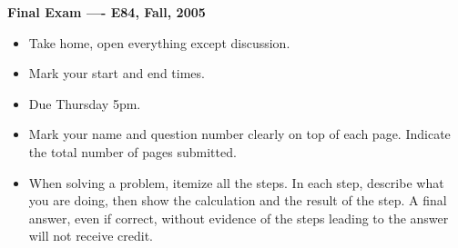 \usepackage{html}

\begin{center}
{\Large \bf  Final Exam ---- E84, Fall, 2005}
\end{center}

\begin{itemize}
\item Take home, open everything except discussion.
\item Mark your start and end times. %
\item Due Thursday 5pm.
\item Mark your name and question number clearly on top of each page.
	Indicate the total number of pages submitted.
\item When solving a problem, itemize all the steps. In each step, 
  describe what you are doing, then show the calculation and the result 
  of the step. A final answer, even if correct, without evidence of the
  steps leading to the answer will not receive credit.
\end{itemize}

